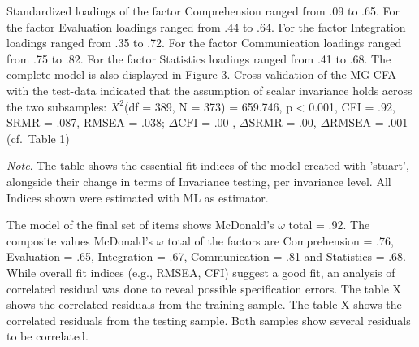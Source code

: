 \documentclass[
  12pt,
  a4paper,
  twoside]{article}
\begin{document}
Standardized loadings of the factor Comprehension ranged from .09 to .65. For the factor Evaluation loadings ranged from .44 to .64. For the factor Integration loadings ranged from .35 to .72. For the factor Communication loadings ranged from .75 to .82. For the factor Statistics loadings ranged from .41 to .68. The complete model is also displayed in Figure 3.
Cross-validation of the MG-CFA with the test-data indicated that the assumption of scalar invariance holds across the two subsamples: \(X^{2}\)(df = 389, N = 373) = 659.746, p \textless{} 0.001, CFI = .92, SRMR = .087, RMSEA = .038; \(\Delta\text{CFI}\) = .00 , \(\Delta\text{SRMR}\) = .00, \(\Delta\text{RMSEA}\) = .001 (cf.~Table 1)

\begin{table}[htpb]
\caption{Fit Indices for Model and Results of MG-CFA testing}


\vspace{10pt}  %
\small\textit{Note}. The table shows the essential fit indices of the model created with 'stuart', alongside their change in terms of Invariance testing, per invariance level. All Indices shown were estimated with ML as estimator.
\end{table}

The model of the final set of items shows McDonald's \(\omega\) total = .92. The composite values McDonald's \(\omega\) total of the factors are Comprehension = .76, Evaluation = .65, Integration = .67, Communication = .81 and Statistics = .68.
While overall fit indices (e.g., RMSEA, CFI) suggest a good fit, an analysis of correlated residual was done to reveal possible specification errors.
The table X shows the correlated residuals from the training sample. The table X shows the correlated residuals from the testing sample. Both samples show several residuals to be correlated.
\end{document}
